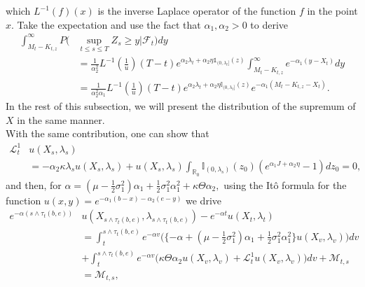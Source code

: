 \documentclass[11pt]{article}
\numberwithin{equation}{section}
\begin{document}
which $L^{-1}(f)(x)$ is the inverse Laplace operator of the function $f$ in the point $x$.
Take the expectation and use the fact that $\alpha_1, \alpha_2 >0$ to derive 
\begin{align}
\int_{M_t-K_{t,z}}^\infty P(&\sup_{t \leq s \leq T}Z_s \geq y \vert \mathcal{F}_t)dy\nonumber\\
& = \frac{1}{\alpha_2^2} L^{-1}(\frac{1}{u})(T-t)  e^{\alpha_2\lambda_t+\alpha_2\eta\mathbb{1}_{(0,\lambda_t]}(z)}   \int_{M_t-K_{t,z}}^\infty  e^{-\alpha_1 (y-X_t)} dy\nonumber \\
&=  \frac{1}{\alpha_2^2\alpha_1} L^{-1}(\frac{1}{u})(T-t)  e^{\alpha_2\lambda_t+\alpha_2\eta\mathbb{I}_{(0,\lambda_t]}(z)}    e^{-\alpha_1 (M_t-K_{t,z}-X_t)}.\label{distribute1}
\end{align}
In the rest of this subsection, we will present the distribution of the supremum of $X$ in the same manner. \\
With the same contribution, one can show that 
\begin{align*}
\mathcal{L}_t^1&u(X_s, \lambda_s) \\
&= -\alpha_2 \kappa \lambda_s u(X_s,\lambda_s)+ u(X_s,\lambda_s)\int_{\mathbb{R}_0} \mathbb{I}_{(0,\lambda_s)}(z_0)(e^{\alpha_1 J+ \alpha_2 \eta }- 1)dz_0=0,
\end{align*}
and then, for $\alpha= (\mu-\frac12 \sigma_1^2) \alpha_1 +\frac12 \sigma_1^2\alpha_1^2 +\kappa \Theta \alpha_2,$ using the It\^o formula for the function $u(x,y)=e^{-\alpha_1(b-x)-\alpha_2(e-y)}$ we drive
\begin{align}
e^{-\alpha ({s\wedge{\tau}_{t}(b,e)})} & u(X_{s\wedge{\tau}_{t}(b,e)}, \lambda_{s \wedge{\tau}_{t}(b,e)}) -e^{-\alpha t} u(X_{t}, \lambda_{t}) \nonumber\\
&  = \int_t^{s \wedge{\tau}_{t}(b,e)} e^{-\alpha v}\Big(\{-\alpha+(\mu-\frac12 \sigma_1^2)\alpha_1+ \frac12  \sigma_1^2\alpha_1^2\} u(X_v,\lambda_v)\Big) dv\nonumber\\
&+  \int_t^{s \wedge{\tau}_{t}(b,e)}  e^{-\alpha v}\Big(\kappa\Theta \alpha_2 u(X_v,\lambda_v) +  \mathcal{L}_t^1 u(X_v,\lambda_v)\Big) dv +\mathcal{M}_{t,s}\nonumber\\
&= \mathcal{M}_{t,s},\nonumber\\
\end{align}
\end{document}
